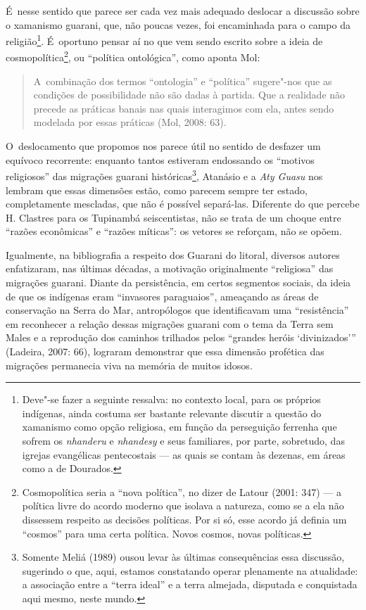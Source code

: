 É~nesse sentido que parece ser cada vez mais adequado deslocar a
discussão sobre o xamanismo guarani, que, não poucas vezes, foi
encaminhada para o campo da religião\footnote{Deve"-se fazer a seguinte
ressalva: no contexto local, para os próprios indígenas, ainda costuma
ser bastante relevante discutir a questão do xamanismo como opção
religiosa, em função da perseguição ferrenha que sofrem os \emph{nhanderu} e
\emph{nhandesy} e seus familiares, por parte, sobretudo, das igrejas
evangélicas pentecostais --- as quais se contam às dezenas, em áreas como
a de Dourados.}. É~oportuno pensar aí no que vem sendo escrito sobre
a ideia de cosmopolítica\footnote{Cosmopolítica seria a ``nova
política'', no dizer de Latour (2001: 347) --- a política livre do acordo
moderno que isolava a natureza, como se a ela não dissessem respeito as
decisões políticas. Por si só, esse acordo já definia um ``cosmos'' para
uma certa política. Novos cosmos, novas políticas.}, ou ``política
ontológica'', como aponta Mol: 

\begin{quote}
\noindent
A~combinação dos termos ``ontologia'' e ``política'' sugere"-nos que as
condições de possibilidade não são dadas à partida. Que a realidade não
precede as práticas banais nas quais interagimos com ela, antes sendo
modelada por essas práticas (Mol, 2008: 63).
\end{quote}

O~deslocamento que propomos nos parece útil no sentido de desfazer um
equívoco recorrente: enquanto tantos estiveram endossando os ``motivos
religiosos'' das migrações guarani históricas\footnote{Somente Meliá
(1989) ousou levar às últimas consequências essa discussão, sugerindo o
que, aqui, estamos constatando operar plenamente na atualidade: a
associação entre a ``terra ideal'' e a terra almejada, disputada e
conquistada aqui mesmo, neste mundo.}, Atanásio e a \emph{Aty Guasu} nos
lembram que essas dimensões estão, como parecem sempre ter estado,
completamente mescladas, que não é possível separá-las. Diferente do
que percebe H. Clastres para os Tupinambá seiscentistas, não se trata
de um choque entre ``razões econômicas'' e ``razões míticas'': os vetores
se reforçam, não se opõem.

Igualmente, na bibliografia a respeito dos Guarani do litoral, diversos
autores enfatizaram, nas últimas décadas, a motivação originalmente
``religiosa'' das migrações guarani. Diante da persistência, em certos
segmentos sociais, da ideia de que os indígenas eram ``invasores
paraguaios'', ameaçando as áreas de conservação na Serra do Mar,
antropólogos que identificavam uma ``resistência'' em reconhecer a
relação dessas migrações guarani com o tema da Terra sem Males e a
reprodução dos caminhos trilhados pelos ``grandes heróis ‘divinizados’''
(Ladeira, 2007: 66), lograram demonstrar que essa dimensão profética
das migrações permanecia viva na memória de muitos idosos. 

